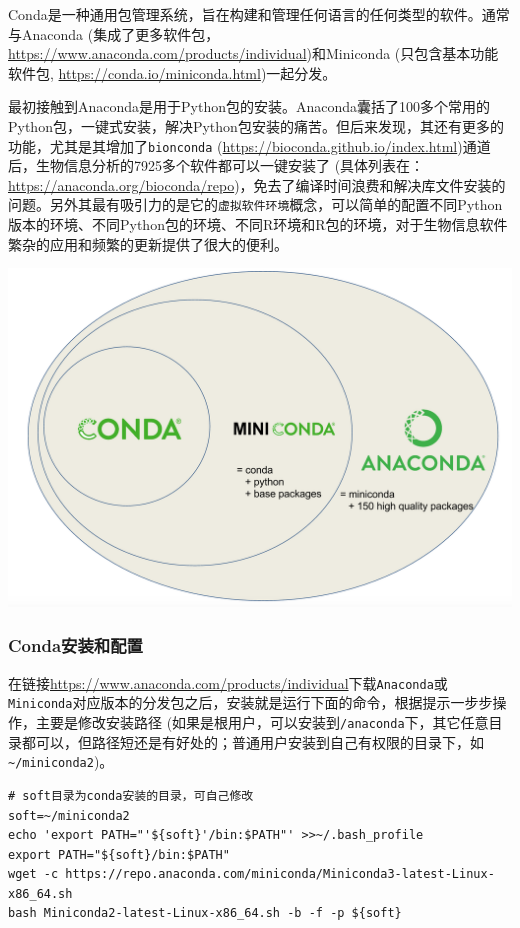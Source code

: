 \documentclass[]{article}
\makeatletter
\let\Oldincludegraphics\includegraphics
\def\maxwidth{\ifdim\Gin@nat@width>\linewidth\linewidth
\else\Gin@nat@width\fi}
\let\Oldincludegraphics\includegraphics
\renewcommand{\includegraphics}[1]{\Oldincludegraphics[width=0.7\maxwidth,height=0.8\textheight,keepaspectratio=true]{#1}}
\numberwithin{figure}{section}
\numberwithin{table}{section}
\makeatother
\begin{document}
Conda是一种通用包管理系统，旨在构建和管理任何语言的任何类型的软件。通常与Anaconda (集成了更多软件包，\url{https://www.anaconda.com/products/individual})和Miniconda (只包含基本功能软件包, \url{https://conda.io/miniconda.html})一起分发。

最初接触到Anaconda是用于Python包的安装。Anaconda囊括了100多个常用的Python包，一键式安装，解决Python包安装的痛苦。但后来发现，其还有更多的功能，尤其是其增加了\texttt{bionconda} (\url{https://bioconda.github.io/index.html})通道后，生物信息分析的7925多个软件都可以一键安装了 (具体列表在：\url{https://anaconda.org/bioconda/repo})，免去了编译时间浪费和解决库文件安装的问题。另外其最有吸引力的是它的\texttt{虚拟软件环境}概念，可以简单的配置不同Python版本的环境、不同Python包的环境、不同R环境和R包的环境，对于生物信息软件繁杂的应用和频繁的更新提供了很大的便利。

\includegraphics{image/conda.png}

\hypertarget{condaInstallConfig}{%
\subsubsection{Conda安装和配置}\label{condaInstallConfig}}

在链接\url{https://www.anaconda.com/products/individual}下载\texttt{Anaconda}或\texttt{Miniconda}对应版本的分发包之后，安装就是运行下面的命令，根据提示一步步操作，主要是修改安装路径 (如果是根用户，可以安装到\texttt{/anaconda}下，其它任意目录都可以，但路径短还是有好处的；普通用户安装到自己有权限的目录下，如\texttt{\textasciitilde{}/miniconda2})。

\begin{verbatim}
# soft目录为conda安装的目录，可自己修改
soft=~/miniconda2
echo 'export PATH="'${soft}'/bin:$PATH"' >>~/.bash_profile
export PATH="${soft}/bin:$PATH"
wget -c https://repo.anaconda.com/miniconda/Miniconda3-latest-Linux-x86_64.sh
bash Miniconda2-latest-Linux-x86_64.sh -b -f -p ${soft}
\end{verbatim}
\end{document}
